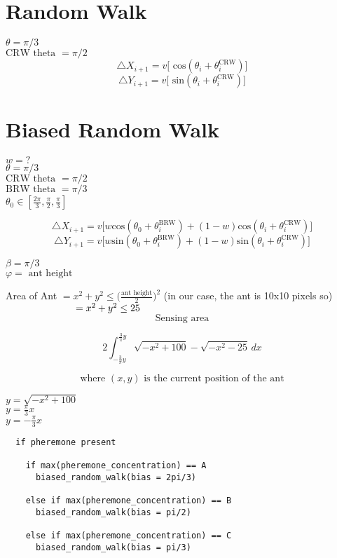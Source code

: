 \documentclass[12pt]{article}
\begin{document}

\section{Random Walk}

$ \theta = \pi /3 $ \\
$ \text{CRW theta }= \pi /2 $ \\

$$ \triangle X_{i+1} = v\big[ \text{ cos}(\theta_i+\theta_i^{\text{CRW}}) \big] $$
$$ \triangle Y_{i+1} = v\big[ \text{ sin}(\theta_i+\theta_i^{\text{CRW}}) \big] $$


\section{Biased Random Walk}

$ w = ? $ \\
$ \theta = \pi /3 $ \\
$ \text{CRW theta }= \pi /2 $ \\
$ \text{BRW theta }= \pi /3 $ \\
$ \theta_0 \in [\frac{2\pi}{3}, \frac{\pi}{2}, \frac{\pi}{3}] $ 

$$ \triangle X_{i+1} = v\big[ w \text{cos}(\theta_0+\theta_i^{\text{BRW}}) + (1-w) \text{cos}(\theta_i+\theta_i^{\text{CRW}}) \big] $$
$$ \triangle Y_{i+1} = v\big[ w \text{sin}(\theta_0+\theta_i^{\text{BRW}}) + (1-w) \text{sin}(\theta_i+\theta_i^{\text{CRW}}) \big] $$

$\beta = \pi / 3 $ \\
$ \varphi = \text{ ant height} $

\vskip0.5pc

Area of Ant $ = x^2 + y^2 \leq \Big( \frac{\text{ant height}}{2}\Big)^2$ (in our case, the ant is 10x10 pixels so) \\
$\hspace*{2.5cm} = x^2+y^2 \leq 25 $\\

  $$\text{Sensing area}$$

$$  2\int_{-\frac3{\pi}y}^{\frac3{\pi}y} \sqrt{-x^2+100}-\sqrt{-x^2-25} \,dx $$

$$ \text{where } (x, y) \text{ is the current position of the ant} $$

$ y = \sqrt{-x^2+100}$\\

$y = \frac{\pi}{3}x$\\

$y = -\frac{\pi}{3}x$

\newpage
\begin{lstlisting}
  if pheremone present
    
    if max(pheremone_concentration) == A
      biased_random_walk(bias = 2pi/3)

    else if max(pheremone_concentration) == B
      biased_random_walk(bias = pi/2)

    else if max(pheremone_concentration) == C
      biased_random_walk(bias = pi/3)

  
\end{lstlisting}
\end{document}
